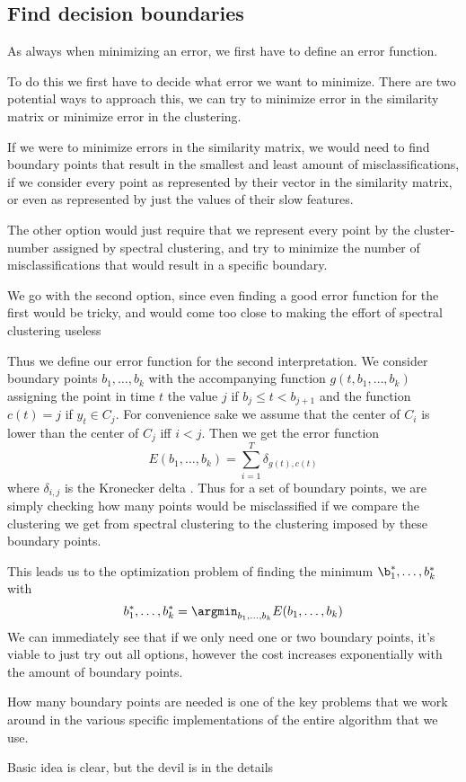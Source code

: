\subsection{Find decision boundaries}
As always when minimizing an error, we first have to define an error function. 

To do this we first have to decide what error we want to minimize. There are two potential ways to approach this, we can try to minimize error in the similarity matrix or minimize error in the clustering. 

If we were to minimize errors in the similarity matrix, we would need to find boundary points that result in the smallest and least amount of misclassifications, if we consider every point as represented by their vector in the similarity matrix, or even as represented by just the values of their slow features.

The other option would just require that we represent every point by the cluster-number assigned by spectral clustering, and try to minimize the number of misclassifications  that would result in a specific boundary. 

We go with the second option, since even finding a good error function for the first would be tricky, and would come too close to making the effort of spectral clustering useless  

Thus we define our error function for the second interpretation. We consider boundary points $b_1,\ldots,b_k$ with the accompanying function $g(t,b_1,\ldots,b_k)$ assigning the point in time $t$ the value $j$ if $b_j\leq t <b_{j+1}$ and the function $c(t)=j$ if $y_t \in C_j$. For convenience sake we assume that the center of $C_i$ is lower than the center of $C_j$ iff  $i<j$. Then we get the error function 
\[
E(b_1,\ldots,b_k)=\sum_{i=1}^T \delta_{g(t),c(t)}
\]
where $\delta_{i,j}$ is the Kronecker delta . Thus for a set of boundary points, we are simply checking how many points would be misclassified if we compare the clustering we get from spectral clustering to the clustering imposed by these boundary points.

This leads us to the optimization problem of finding the minimum $\b_1^*,\ldots,b_k^*$ with 
\[
b_1^*,\ldots,b_k^*=\argmin_{b_1,\ldots,b_k} E(b_1,\ldots,b_k) 
\]
We can immediately see that if we only need one or two boundary points, it's viable to just try out all options, however the cost increases exponentially with the amount of boundary points.

How many boundary points are needed is one of the key problems that we work around in the various specific implementations of the entire algorithm that we use.

Basic idea is clear, but the devil is in the details